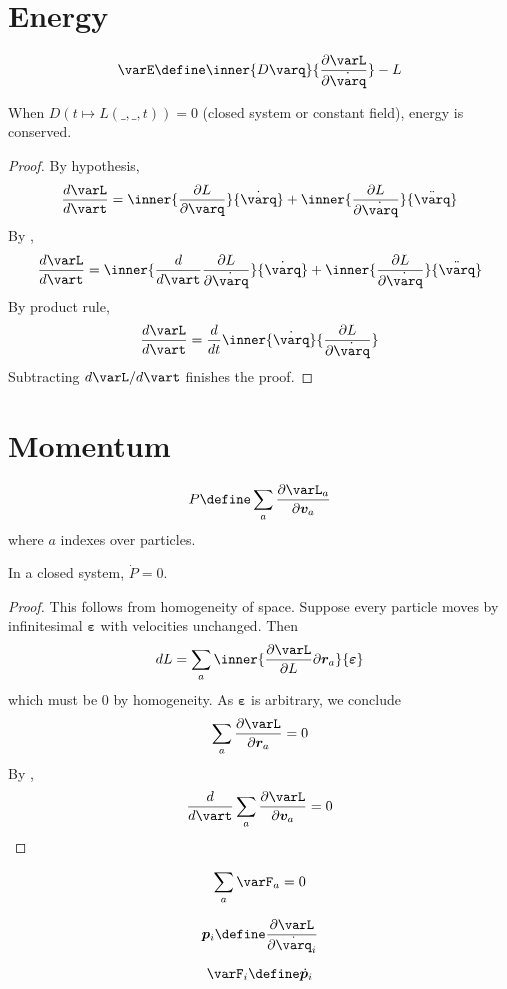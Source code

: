 \documentclass{scrbook}
\numberwithin{thms}{chapter}
\newcommand{\der}{\dot}
\newcommand{\dder}{\ddot}
\renewcommand{\vec}[1]{\bm{#1}}
\newcommand{\Der}{D}
\begin{document}
\section{Energy}
\begin{defn}[energy]
  \label{def:energy}
  \[
    \varE\define  \inner{\Der \varq}{\frac{\partial\varL}{\partial \derq}} - L
  \]
\end{defn}
\begin{theorem}
  When $\Der(t\mapsto L(\_,\_,t)) =0$ (\eg closed system or constant field), energy is conserved. 
\end{theorem}
\begin{proof}
  By hypothesis, 
  \[
    \frac{d\varL}{d\vart} = \inner{\frac{\partial L}{\partial \varq}}{\der \varq} + \inner{\frac{\partial L}{\partial \derq}}{\dder \varq}
  \]
  By ,
  \[
    \frac{d\varL}{d\vart} = \inner{\frac{d}{d\vart}\frac{\partial L}{\partial \der\varq}}{\der \varq} + \inner{\frac{\partial L}{\partial \derq}}{\dder \varq}
  \]
  By product rule, 
  \[
    \frac{d\varL}{d\vart} = \frac{d}{dt}\inner{\derq}{\frac{\partial L}{\partial \der \varq}}
  \]
  Subtracting $d\varL/d\vart$ finishes the proof. 
\end{proof}
\section{Momentum}
\begin{defn}[momentum]\label{def:momentum}
  \renewcommand{\varv}{\vec v}
  \renewcommand{\varr}{\vec r}
  \[
    P\define \sum_a \frac{\partial \varL_a}{\partial\varv_a}
  \]
  where $a$ indexes over particles. 
\end{defn}
\begin{theorem}
  In a closed system, $\der P=0$. 
\end{theorem}
\begin{proof}
  \newcommand{\nudge}{\vec\varepsilon}
  \newcommand{\dL}{dL}
  \renewcommand{\varr}{\vec r}
  This follows from homogeneity of space. Suppose every particle moves by infinitesimal $\nudge$ with velocities unchanged. Then 
  \[
    \dL = \sum_a \inner{\frac{\partial \varL}{\partial L}{\partial \varr_a}}{\nudge}
  \]
  which must be $0$ by homogeneity. As $\nudge$ is arbitrary, we conclude 
  \[
    \sum_a \frac{\partial \varL}{\partial \varr_a}=0
  \]
  By ,
  \[
    \frac{d}{d\vart}\sum_a \frac{\partial \varL}{\partial \varv_a} = 0
  \]
\end{proof}
\begin{cor}
  \[
    \sum_a \vec \varF_a =0 
  \]
\end{cor}
\begin{defn}
  \[
    \varp_i \define \frac{\partial \varL}{\partial \der\varq_i}
  \]
\end{defn}
\begin{defn}
  \[
    \varF_i \define \der \varp_i
  \]
\end{defn}
\end{document}

